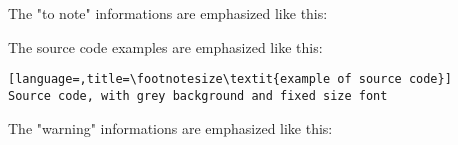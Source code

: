 \noindent The "to note" informations are emphasized like this:\\

\bigskip

\noindent The source code examples are emphasized like this:
\begin{lstlisting}[language=,title=\footnotesize\textit{example of source code}]
Source code, with grey background and fixed size font
\end{lstlisting}


\bigskip

\noindent The "warning" informations are emphasized like this:\\

